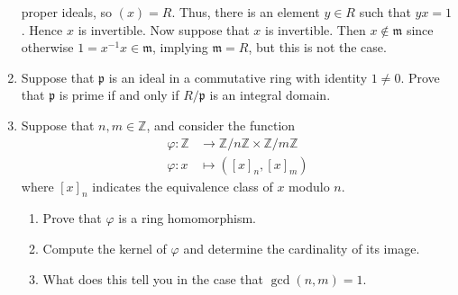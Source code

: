 \documentclass[12pt]{article}
\newcommand{\bbZ}{\mathbb{Z}}
\newcommand{\solution}[1]{\textcolor{red}{#1}}
\renewcommand{\solution}[1]{}
\begin{document}
\begin{enumerate}
{  proper ideals, so $(x)=R$. Thus, there is an element $y\in R$ such
  that $yx=1$. Hence $x$ is invertible. Now suppose that $x$ is
  invertible. Then $x\notin \mathfrak{m}$ since otherwise
  $1=x^{-1}x\in \mathfrak{m}$, implying $\mathfrak{m}=R$, but this is
  not the case.}
\item Suppose that $\mathfrak{p}$ is an ideal in a commutative ring
  with identity $1\neq 0$. Prove that $\mathfrak{p}$ is prime if and only if
    $R/\mathfrak{p}$ is an integral domain. 
\solution{Suppose that $p$ is a prime ideal, and let $x, y\in
  R$ such that $(x+p)(y+p)=0+p$ in $R/p$. Then $xy\in p$. By
  definition, then, either $x\in p$ or $y\in p$. Hence, $x+p=0$ or
  $y+p=0$. 
Now suppose that $R/p$ is an integral domain, and $x,y\in R$ such that
$xy\in p$. Then $(x+p)(y+p)=0+p$, and by assumption, one of the two
must be zero. Hence, for example, $x+p=0$ implies $x\in p$.}
\item Suppose that $n,m\in \bbZ$, and consider the function 
  \begin{align*}
    \varphi: \bbZ & \rightarrow \bbZ/n\bbZ \times \bbZ/m\bbZ\\
    \varphi: x & \mapsto ([x]_n, [x]_m)
  \end{align*}
where $[x]_n$ indicates the equivalence class of $x$ modulo $n$.
\begin{enumerate}
\item Prove that $\varphi$ is a ring homomorphism.
\solution{Projection maps are homomorphisms and products of
  homomorphisms are homomorphisms.}
\item Compute the kernel of $\varphi$ and determine the cardinality of
  its image. 
\newcommand{\lcm}{\operatorname{lcm}}
\solution{Suppose $x\in \ker \varphi$. Then $[x]_n=0$ and
  $[x]_m=0$. Hence, $x$ is a multiple of both $n$ and $m$. Thus, $\ker
  \varphi=(\lcm(n,m))\bbZ$. Note that the cardinality of the image is,
therefore, equal to the cardinality of $\bbZ/\lcm(n,m)\bbZ$, which is
precisely $\lcm(n,m)$.}
\item What does this tell you in the case that $\gcd(n,m)=1$. 
\solution{In this case, the cardinality of the image is $nm$, which is
precisely the cardinality of the codomain. Hence, $\varphi$ is onto,
so $\bbZ/nm\bbZ \cong \bbZ/n\bbZ \times \bbZ/m\bbZ$ as rings.}
\end{enumerate}


\end{enumerate}
\end{document}
